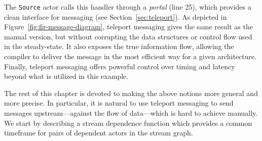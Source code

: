 \clearpage
 \addtocounter{page}{-2} 
\noindent 
\clearpage
\begin{figure}[t]
\vspace{-1in}
\hspace{-1in}
\end{figure}
\clearpage
%
\noindent The {\tt Source} actor calls this handler through a
{\it portal} (line 25), which provides a clean interface for messaging
(see Section~\ref{sec:teleport}).  As depicted in
Figure~\ref{fig:fir-message-diagram}, teleport messaging gives the
same result as the manual version, but without corrupting the data
structures or control flow used in the steady-state.  It also exposes
the true information flow, allowing the compiler to deliver the
message in the most efficient way for a given architecture.  Finally,
teleport messaging offers powerful control over timing and latency
beyond what is utilized in this example.

The rest of this chapter is devoted to making the above notions more
general and more precise.  In particular, it is natural to use
teleport messaging to send messages upstream---against the flow of
data---which is hard to achieve manually.  We start by describing a
stream dependence function which provides a common timeframe for pairs
of dependent actors in the stream graph.

